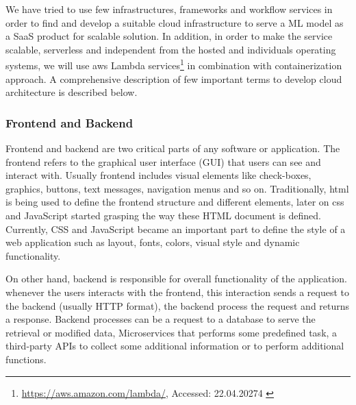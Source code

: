 We have tried to use few infrastructures, frameworks and workflow services in order to find and develop a suitable cloud infrastructure to serve a ML model as a SaaS product for scalable solution. In addition, in order to make the service scalable, serverless and independent from the hosted and individuals operating systems, we will use \acrshort{aws} Lambda services\footnote{\url{https://aws.amazon.com/lambda/}, Accessed: 22.04.20274 \label{lambda}} in combination with containerization approach. A comprehensive description of few important terms to develop cloud architecture is described below. 

\subsubsection{Frontend and Backend}
Frontend and backend are two critical parts of any software or application. The frontend refers to the graphical user interface (GUI) that users can see and interact with. Usually frontend includes visual elements like check-boxes, graphics, buttons, text messages, navigation menus and so on. Traditionally, \acrfull{html} is being used to define the frontend structure and different elements, later on \acrfull{css} and JavaScript started grasping the way these HTML document is defined. Currently, CSS and JavaScript became an important part to define the style of a web application such as layout, fonts, colors, visual style and dynamic functionality. 

On other hand, backend is responsible for overall functionality of the application. whenever the users interacts with the frontend, this interaction sends a request to the backend (usually HTTP format), the backend process the request and returns a response. Backend processes can be a request to a database to serve the retrieval or modified data, Microservices that performs some predefined task, a third-party APIs to collect some additional information or to perform additional functions.


